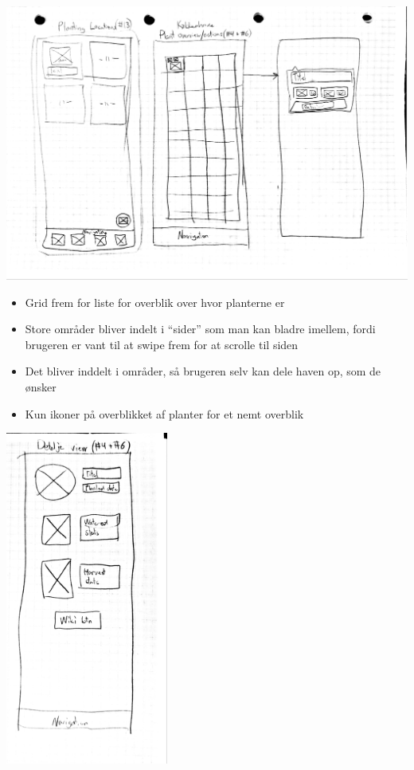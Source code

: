 \includegraphics[width=1\textwidth]{img/s1-4.jpg}\\

\begin{itemize}
    \item Grid frem for liste for overblik over hvor planterne er
    \item Store områder bliver indelt i ``sider'' som man kan bladre imellem, fordi brugeren er vant til at swipe frem for at scrolle til siden
    \item Det bliver inddelt i områder, så brugeren selv kan dele haven op, som de ønsker
    \item Kun ikoner på overblikket af planter for et nemt overblik
\end{itemize}

\includegraphics[width=0.4\textwidth]{img/s1-2.jpg}\\

